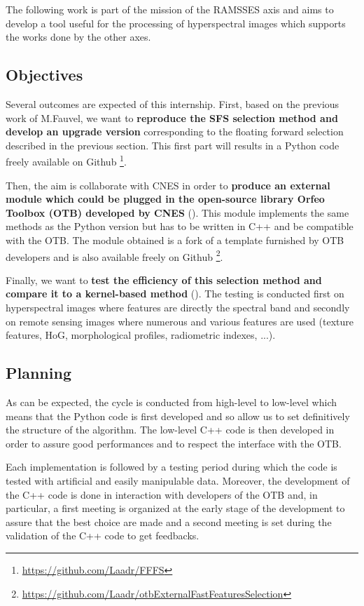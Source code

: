 \documentclass[a4paper,11pt,DIV=16,abstracton]{scrartcl}
\begin{document}
    The following work is part of the mission of the RAMSSES axis and aims to develop a tool useful for the processing of hyperspectral images which supports the works done by the other axes.

    \subsection{Objectives}

    Several outcomes are expected of this internship. First, based on the previous work \cite{fauvel2015fast} of M.Fauvel, we want to {\bfseries reproduce the SFS selection method and develop an upgrade version} corresponding to the floating forward selection described in the previous section. This first part will results in a Python code freely available on Github \footnote{\url{https://github.com/Laadr/FFFS}}.

    Then, the aim is collaborate with CNES in order to {\bfseries produce an external module which could be plugged in the open-source library Orfeo Toolbox (OTB) developed by CNES} (\cite{christophe2008orfeo}). This module implements the same methods as the Python version but has to be written in C++ and be compatible with the OTB. The module obtained is a fork of a template furnished by OTB developers and is also available freely on Github \footnote{\url{https://github.com/Laadr/otbExternalFastFeaturesSelection}}.

    Finally, we want to {\bfseries test the efficiency of this selection method and compare it to a kernel-based method} (\cite{camps2010remote}). The testing is conducted first on hyperspectral images where features are directly the spectral band and secondly on remote sensing images where numerous and various features are used (texture features, HoG, morphological profiles, radiometric indexes, ...).

    \subsection{Planning}

    As can be expected, the cycle is conducted from high-level to low-level which means that the Python code is first developed and so allow us to set definitively the structure of the algorithm. The low-level C++ code is then developed in order to assure good performances and to respect the interface with the OTB.

    Each implementation is followed by a testing period during which the code is tested with artificial and easily manipulable data. Moreover, the development of the C++ code is done in interaction with developers of the OTB and, in particular, a first meeting is organized at the early stage of the development to assure that the best choice are made and a second meeting is set during the validation of the C++ code to get feedbacks.
\end{document}
